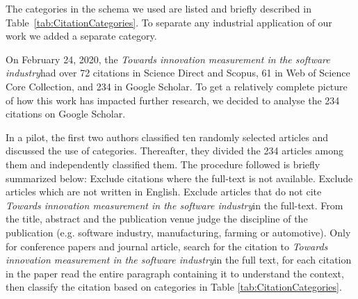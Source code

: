 \documentclass[sigplan]{acmart}
\newcommand{\theArticle}{\textit{Towards innovation measurement in the software industry}}
\begin{document}
The categories in the schema we used are listed and briefly described in Table~\ref{tab:CitationCategories}. To separate any industrial application of our work we added a separate category. 

On February 24, 2020, the \theArticle  had over 72 citations in Science Direct and Scopus, 61 in Web of Science Core Collection, and 234 in Google Scholar. To get a relatively complete picture of how this work has impacted further research, we decided to analyse the 234 citations on Google Scholar. 

In a pilot, the first two authors classified ten randomly selected articles and discussed the use of categories. Thereafter, they divided the 234 articles among them and  independently classified them. The procedure followed is briefly summarized below: 
Exclude citations where the full-text is not available. 
Exclude articles which are not written in English.
Exclude articles  that do not cite \theArticle in the full-text.
From the title, abstract and the publication venue judge the discipline of the publication (e.g. software industry, manufacturing, farming or automotive).
Only for conference papers and journal article, search for the citation to \theArticle in the full text, for each citation in the paper  read the entire paragraph containing it to understand the context, then classify the citation based on categories in Table \ref{tab:CitationCategories}. 
\end{document}
